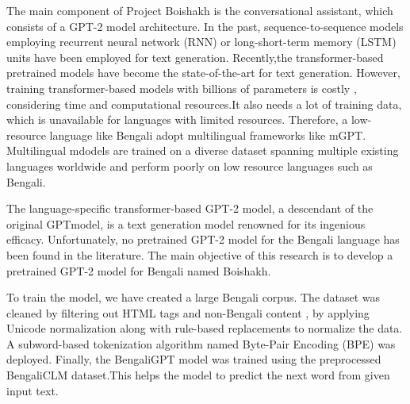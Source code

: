 The main component of Project Boishakh is the conversational assistant, which consists of a GPT-2 model architecture. In the past, sequence-to-sequence models employing recurrent neural network (RNN) or long-short-term memory (LSTM) units have been employed for text generation. Recently,the transformer-based pretrained models have become the state-of-the-art for text generation. However, training transformer-based models with billions of parameters is costly , considering time and computational resources.It also needs a lot of training data, which is unavailable for languages with limited resources. Therefore, a low-resource language like Bengali adopt multilingual frameworks like mGPT. Multilingual mdodels are trained on a diverse dataset spanning multiple existing languages worldwide and perform poorly on low resource languages such as Bengali.

The language-specific transformer-based GPT-2 model, a descendant of the original GPTmodel, is a text generation model renowned for its ingenious efficacy. Unfortunately, no pretrained GPT-2 model for the Bengali language has been found in the literature. The main objective of this research is to develop a pretrained GPT-2 model for Bengali named Boishakh.

To train the model, we have created a large Bengali corpus. The dataset was cleaned by filtering out HTML tags and non-Bengali content , by applying Unicode normalization along with rule-based replacements to normalize the data. A subword-based tokenization algorithm named Byte-Pair Encoding (BPE) was deployed. Finally, the BengaliGPT model was trained using the preprocessed BengaliCLM dataset.This helps the model to predict the next word from given input text.
